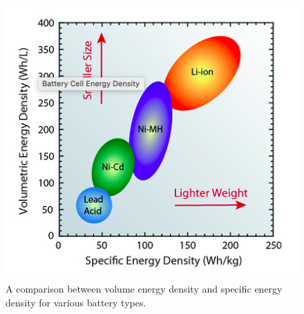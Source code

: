 \begin{figure}
    \centering
    \includegraphics[scale=0.4]{figures/energy density.png}
    \caption{A comparison between volume energy density and specific energy density for various battery types.}
    \label{fig:energy-density} 
\end{figure}

